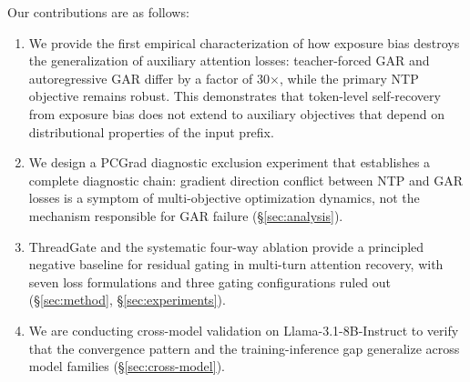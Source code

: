 Our contributions are as follows:
\begin{enumerate}
    \item We provide the first empirical characterization of how exposure bias destroys the generalization of auxiliary attention losses: teacher-forced GAR and autoregressive GAR differ by a factor of 30$\times$, while the primary NTP objective remains robust. This demonstrates that token-level self-recovery from exposure bias \citep{he2019exposure} does not extend to auxiliary objectives that depend on distributional properties of the input prefix.
    \item We design a PCGrad diagnostic exclusion experiment that establishes a complete diagnostic chain: gradient direction conflict between NTP and GAR losses is a symptom of multi-objective optimization dynamics, not the mechanism responsible for GAR failure (\S\ref{sec:analysis}).
    \item ThreadGate and the systematic four-way ablation provide a principled negative baseline for residual gating in multi-turn attention recovery, with seven loss formulations and three gating configurations ruled out (\S\ref{sec:method}, \S\ref{sec:experiments}).
    \item We are conducting cross-model validation on Llama-3.1-8B-Instruct to verify that the convergence pattern and the training-inference gap generalize across model families (\S\ref{sec:cross-model}).
\end{enumerate}